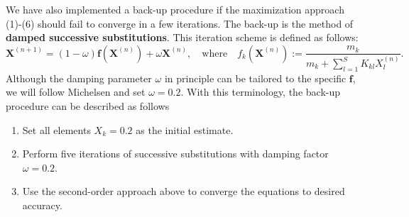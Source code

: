 \documentclass[english]{../thermomemo/thermomemo}
\newcommand{\mbf}[0]{\mathbf}
\begin{document}
We have also implemented a back-up procedure if the maximization approach (1)-(6) should fail to converge in a few iterations. The back-up is the method of \textbf{damped successive substitutions}. This iteration scheme is defined as follows:
\begin{equation}
  \label{successiveSubs}
  \mbf X^{(n+1)} = (1-\omega) \mbf f (\mbf X^{(n)}) + \omega \mbf X^{(n)}, \quad \text{where} \quad f_k(\mbf X^{(n)}) := \frac{m_k}{m_k + \sum_{l=1}^S K_{kl} X_l^{(n)}}.
\end{equation}
Although the damping parameter $\omega$ in principle can be tailored to the specific $\mbf f$, we will follow Michelsen \cite{Michelsen06} and set $\omega = 0.2$. With this terminology, the back-up procedure can be described as follows
\begin{enumerate}[(1')]
\item Set all elements $X_k = 0.2$ as the initial estimate.
\item Perform five iterations of successive substitutions with damping factor $\omega = 0.2$.
\item Use the second-order approach above to converge the equations to desired accuracy.
\end{enumerate}
\end{document}

